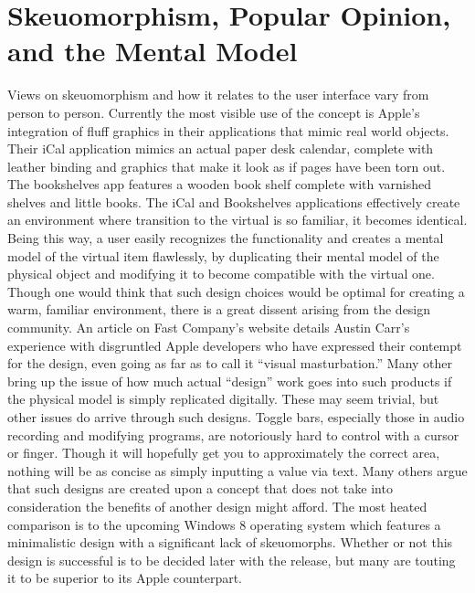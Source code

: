 \documentclass[12pt onesided letterpaper]{report}
\begin{document}
\section*{Skeuomorphism, Popular Opinion, and the Mental Model}
Views on skeuomorphism and how it relates to the user interface vary from person to person.  Currently the most visible use of the concept is Apple’s integration of fluff graphics in their applications that mimic real world objects.  Their iCal application mimics an actual paper desk calendar, complete with leather binding and graphics that make it look as if pages have been torn out.  The bookshelves app features a wooden book shelf complete with varnished shelves and little books. The iCal and Bookshelves applications effectively create an environment where transition to the virtual is so familiar, it becomes identical.  Being this way, a user easily recognizes the functionality and creates a mental model of the virtual item flawlessly, by duplicating their mental model of the physical object and modifying it to become compatible with the virtual one.   Though one would think that such design choices would be optimal for creating a warm, familiar environment, there is a great dissent arising from the design community.  An article on Fast Company’s website details Austin Carr’s experience with disgruntled Apple developers who have expressed their contempt for the design, even going as far as to call it “visual masturbation.”\cite{carr12}  Many other bring up the issue of how much actual “design” work goes into such products if the physical model is simply replicated digitally.  These may seem trivial, but other issues do arrive through such designs.   Toggle bars, especially those in audio recording and modifying programs, are notoriously hard to control with a cursor or finger.  Though it will hopefully get you to approximately the correct area, nothing will be as concise as simply inputting a value via text.  Many others argue that such designs are created upon a concept that does not take into consideration the benefits of another design might afford.  The most heated comparison is to the upcoming Windows 8 operating system which features a minimalistic design with a significant lack of skeuomorphs.  Whether or not this design is successful is to be decided later with the release, but many are touting it to be superior to its Apple counterpart. 
\end{document}
